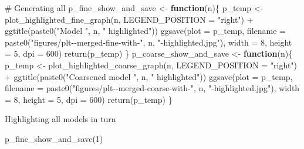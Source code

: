 \documentclass[
  letterpaper,
  DIV=11,
  numbers=noendperiod]{scrartcl}
\newenvironment{Shaded}{\begin{snugshade}}{\end{snugshade}}
\newcommand{\AttributeTok}[1]{\textcolor[rgb]{0.40,0.45,0.13}{#1}}
\newcommand{\CommentTok}[1]{\textcolor[rgb]{0.37,0.37,0.37}{#1}}
\newcommand{\ControlFlowTok}[1]{\textcolor[rgb]{0.00,0.23,0.31}{\textbf{#1}}}
\newcommand{\DecValTok}[1]{\textcolor[rgb]{0.68,0.00,0.00}{#1}}
\newcommand{\FunctionTok}[1]{\textcolor[rgb]{0.28,0.35,0.67}{#1}}
\newcommand{\NormalTok}[1]{\textcolor[rgb]{0.00,0.23,0.31}{#1}}
\newcommand{\OtherTok}[1]{\textcolor[rgb]{0.00,0.23,0.31}{#1}}
\newcommand{\SpecialCharTok}[1]{\textcolor[rgb]{0.37,0.37,0.37}{#1}}
\newcommand{\StringTok}[1]{\textcolor[rgb]{0.13,0.47,0.30}{#1}}
\begin{document}
\begin{Shaded}
\begin{Highlighting}[]
\CommentTok{\# Generating all}
\NormalTok{p\_fine\_show\_and\_save }\OtherTok{\textless{}{-}} \ControlFlowTok{function}\NormalTok{(n)\{}
\NormalTok{    p\_temp }\OtherTok{\textless{}{-}} \FunctionTok{plot\_highlighted\_fine\_graph}\NormalTok{(n, }\AttributeTok{LEGEND\_POSITION =} \StringTok{"right"}\NormalTok{) }\SpecialCharTok{+} \FunctionTok{ggtitle}\NormalTok{(}\FunctionTok{paste0}\NormalTok{(}\StringTok{"Model "}\NormalTok{, n, }\StringTok{" highlighted"}\NormalTok{))}
    \FunctionTok{ggsave}\NormalTok{(}\AttributeTok{plot =}\NormalTok{ p\_temp, }
           \AttributeTok{filename =} \FunctionTok{paste0}\NormalTok{(}\StringTok{"figures/plt{-}{-}merged{-}fine{-}with{-}"}\NormalTok{, n, }\StringTok{"{-}highlighted.jpg"}\NormalTok{),}
           \AttributeTok{width =} \DecValTok{8}\NormalTok{, }\AttributeTok{height =} \DecValTok{5}\NormalTok{, }\AttributeTok{dpi =} \DecValTok{600}\NormalTok{)}
    \FunctionTok{return}\NormalTok{(p\_temp)}
\NormalTok{\}}
\NormalTok{p\_coarse\_show\_and\_save }\OtherTok{\textless{}{-}} \ControlFlowTok{function}\NormalTok{(n)\{}
\NormalTok{    p\_temp }\OtherTok{\textless{}{-}} \FunctionTok{plot\_highlighted\_coarse\_graph}\NormalTok{(n, }\AttributeTok{LEGEND\_POSITION =} \StringTok{"right"}\NormalTok{) }\SpecialCharTok{+} \FunctionTok{ggtitle}\NormalTok{(}\FunctionTok{paste0}\NormalTok{(}\StringTok{"Coarsened model "}\NormalTok{, n, }\StringTok{" highlighted"}\NormalTok{))}
    \FunctionTok{ggsave}\NormalTok{(}\AttributeTok{plot =}\NormalTok{ p\_temp, }
           \AttributeTok{filename =} \FunctionTok{paste0}\NormalTok{(}\StringTok{"figures/plt{-}{-}merged{-}coarse{-}with{-}"}\NormalTok{, n, }\StringTok{"{-}highlighted.jpg"}\NormalTok{),}
           \AttributeTok{width =} \DecValTok{8}\NormalTok{, }\AttributeTok{height =} \DecValTok{5}\NormalTok{, }\AttributeTok{dpi =} \DecValTok{600}\NormalTok{)}
    \FunctionTok{return}\NormalTok{(p\_temp)}
\NormalTok{\}}
\end{Highlighting}
\end{Shaded}

Highlighting all models in turn

\begin{Shaded}
\begin{Highlighting}[]
\FunctionTok{p\_fine\_show\_and\_save}\NormalTok{(}\DecValTok{1}\NormalTok{)}
\end{Highlighting}
\end{Shaded}
\end{document}
